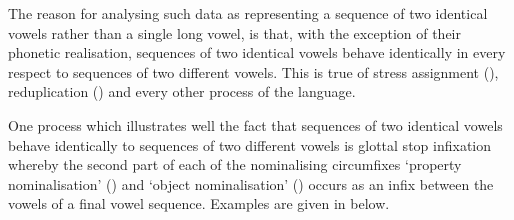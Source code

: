 \begin{multicols}{2}
	\begin{exe}
			\label{as:Syl:fee}
			\label{as:Syl:fe:}
	\end{exe}
\end{multicols}

The reason for analysing such data as representing
a sequence of two identical vowels rather than a single long vowel,
is that, with the exception of their phonetic realisation,
sequences of two identical vowels behave identically
in every respect to sequences of two different vowels.
This is true of stress assignment (), reduplication ()
and every other process of the language.

One process which illustrates well the fact that 
sequences of two identical vowels behave
identically to sequences of two different vowels
is glottal stop infixation whereby the second part of each of
the nominalising circumfixes
 `property nominalisation' ()
and  `object nominalisation' ()
occurs as an infix between the vowels of a final vowel sequence.
Examples are given in  below.

